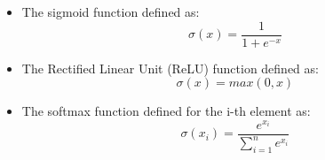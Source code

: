 \begin{itemize}
    \item The sigmoid function defined as:
    \begin{equation}
        \sigma(x)=\frac{1}{1+e^{-x}}
    \end{equation}
    \item The Rectified Linear Unit (ReLU) function defined as:
    \begin{equation}
        \sigma(x)=max(0,x)
    \end{equation}
    \item The softmax function defined for the i-th element as:
    \begin{equation}
        \sigma(x_i)=\frac{e^{x_i}}{\sum_{i=1}^n e^{x_i}}
    \label{eq: activation function}
        \end{equation}
\end{itemize}


